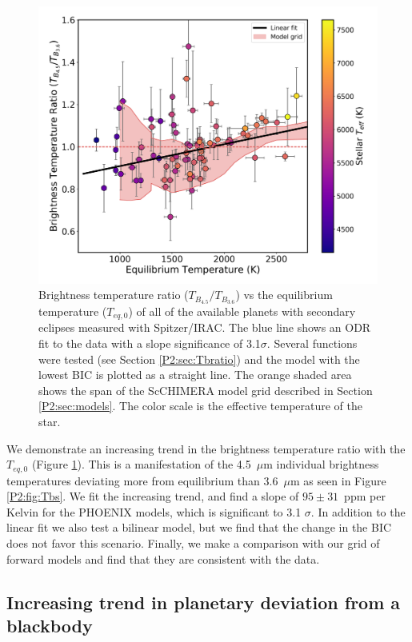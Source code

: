 \begin{figure}
    \centering
    \includegraphics[width=\linewidth]{TbratiovsTeq_wlabels.pdf}
    \caption{Brightness temperature ratio ($T_{B_{4.5}}/T_{B_{3.6}}$) vs the equilibrium temperature ($T_{eq,\textit{0}}$) of all of the available planets with secondary eclipses measured with Spitzer/IRAC. The blue line shows an ODR fit to the data with a slope significance of 3.1$\sigma$. Several functions were tested (see Section \ref{P2:sec:Tbratio}) and  the model with the lowest BIC is plotted as  a straight line. The orange shaded area shows the span of the ScCHIMERA model grid described in Section \ref{P2:sec:models}. The color scale is the effective temperature of the star.}
    \label{P2:fig:ratios}
\end{figure}

We demonstrate an increasing trend in the brightness temperature ratio with the $T_{eq,\textit{0}}$ (Figure \ref{P2:fig:ratios}). This is a manifestation of the 4.5~$\mu$m individual brightness temperatures deviating more from equilibrium than 3.6~$\mu$m as seen in Figure \ref{P2:fig:Tbs}. We fit the increasing trend, and find a slope of $95\pm31$~ppm per Kelvin for the PHOENIX models, which is significant to 3.1 $\sigma$. In addition to the linear fit we also test a bilinear model, but we find that the change in the BIC does not favor this scenario. Finally, we make a comparison with our grid of forward models and find that they are consistent with the data.

\subsection{Increasing trend in planetary deviation from a blackbody}
\label{P2:sec:resultsdevBB}

